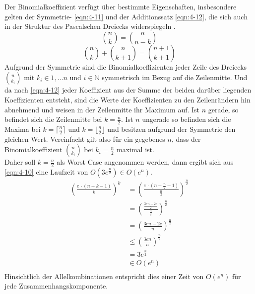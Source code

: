 Der Binomialkoeffizient verfügt über bestimmte Eigenschaften, insbesondere gelten der Symmetrie- \eqref{eqn:4-11} und der Additionssatz \eqref{eqn:4-12}, die sich auch in der Struktur des Pascalschen Dreiecks widerspiegeln \cite{bronst}. 
\begin{equation} \label{eqn:4-11}
\tag{4-11}
\binom{n}{k} = \binom{n}{n - k}
\end{equation} 
\begin{equation} \label{eqn:4-12}
\tag{4-12}
\binom{n}{k} + \binom{n}{k + 1} = \binom{n + 1}{k + 1} 
\end{equation} 
Aufgrund der Symmetrie sind die Binomialkoeffizienten jeder Zeile des Dreiecks $\binom{n}{k_{i}}$ mit $ k_{i} \in 1, \dots n $ und $ i \in \mathds{N} $ symmetrisch im Bezug auf die Zeilenmitte. Und da nach \eqref{eqn:4-12} jeder Koeffizient aus der Summe der beiden darüber liegenden Koeffizienten entsteht, sind die Werte der Koeffizienten zu den Zeilenrändern hin abnehmend und weisen in der Zeilenmitte ihr Maximum auf. Ist $n$ gerade, so befindet sich die Zeilenmitte bei $ k = \frac{n}{2} $. Ist $n$ ungerade so befinden sich die Maxima bei $ k = \lceil \frac{n}{2} \rceil $ und $ k = \lfloor \frac{n}{2} \rfloor $ und besitzen aufgrund der Symmetrie den gleichen Wert. Vereinfacht gilt also für ein gegebenes $n$, dass der Binomialkoeffizient $\binom{n}{k_{i}}$ bei $ k_{i} = \frac{n}{2} $ maximal ist. \\

Daher soll $ k = \frac{n}{2} $ als Worst Case angenommen werden, dann ergibt sich aus \eqref{eqn:4-10} eine Laufzeit von $ O(3e^{\frac{n}{2}} ) \in O(e^n) $. 
\begin{equation} \label{eqn:4-13}
\tag{4-13}
\begin{aligned}
\left( \frac{e \, \cdotp (n + k - 1)}{k}\right)^k &\ {} = \left( \frac{e \, \cdotp (n + \frac{n}{2} - 1)}{\frac{n}{2}}\right)^{\frac{n}{2}}  \\
&\ = \left( \frac{\frac{3en - 2e}{2}} {\frac{n}{2}}\right)^{\frac{n}{2}} \\
&\ = \left( \frac{3en - 2e}{n}\right)^{\frac{n}{2}} \\
&\ \leq \left( \frac{3en}{n}\right)^{\frac{n}{2}}\\
&\ = 3e^{\frac{n}{2}} \\
&\ \in O(e^n)\\
\end{aligned}
\end{equation}
Hinsichtlich der Allelkombinationen entspricht dies einer Zeit von $ O(e^n) $ für jede Zusammenhangskomponente.  \\

